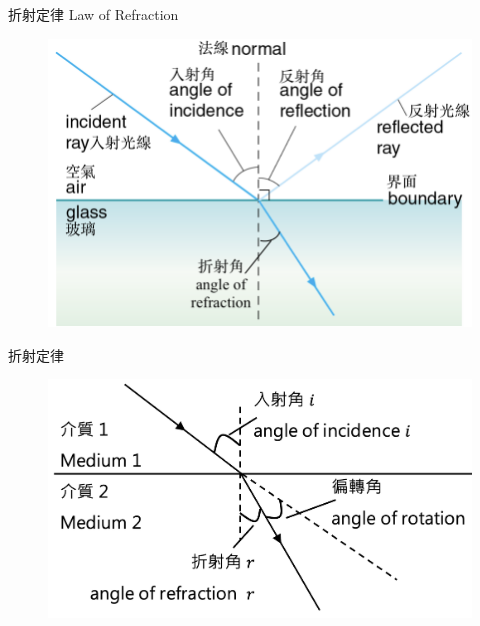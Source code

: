 \documentclass[beamer=true]{standalone}
\begin{document}
\begin{frame}{折射定律 Law of Refraction}
    \begin{figure}
        \centering
        \includegraphics[width=0.75\linewidth]{assets/18309131294639.png}
        
        
    \end{figure}
\end{frame}
\begin{frame}{折射定律}
    \begin{figure}
        \centering
        \includegraphics[width=1\linewidth]{assets/12903819232183921832.png}
        
        
    \end{figure}
\end{frame}
\end{document}
